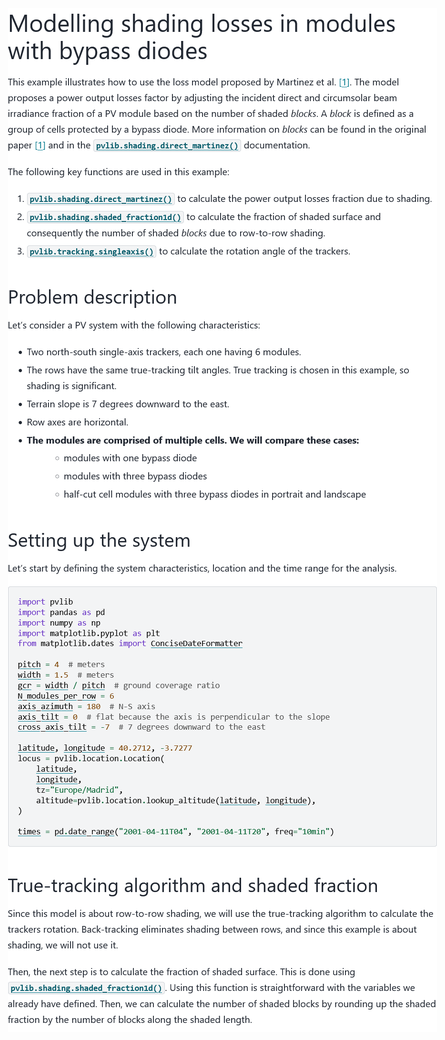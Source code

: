 \begin{myparindent}{0pt}
\includegraphics[width=\linewidth,height=0.9\textheight,keepaspectratio]{images/docs_examples_cut/bypass_diodes_0.png}


\end{myparindent}
